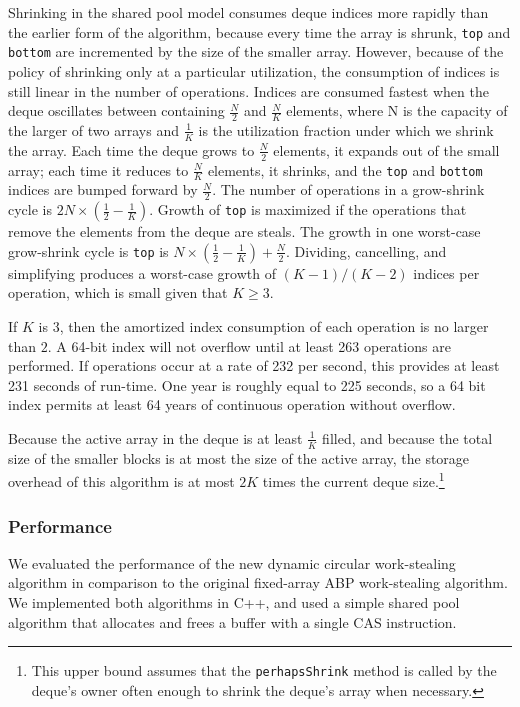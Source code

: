 Shrinking in the shared pool model consumes deque indices more rapidly
than the earlier form of the algorithm, because every time the array
is shrunk, \lstinline!top! and \lstinline!bottom! are incremented by
the size of the smaller array. However, because of the policy of
shrinking only at a particular utilization, the consumption of indices
is still linear in the number of operations. Indices are consumed
fastest when the deque oscillates between containing $\frac{N}{2}$ and
$\frac{N}{K}$ elements, where N is the capacity of the larger of two
arrays and $\frac{1}{K}$ is the utilization fraction under which we
shrink the array. Each time the deque grows to $\frac{N}{2}$ elements,
it expands out of the small array; each time it reduces to
$\frac{N}{K}$ elements, it shrinks, and the \lstinline!top! and
\lstinline!bottom! indices are bumped forward by $\frac{N}{2}$. The
number of operations in a grow-shrink cycle is $2N \times (\frac{1}{2}
- \frac{1}{K})$. Growth of \lstinline!top! is maximized if the
operations that remove the elements from the deque are steals. The
growth in one worst-case grow-shrink cycle is \lstinline!top! is $N
\times (\frac{1}{2} - \frac{1}{K}) + \frac{N}{2}$. Dividing,
cancelling, and simplifying produces a worst-case growth of $(K -
1)/(K - 2)$ indices per operation, which is small given that $K \ge
3$.

If $K$ is $3$, then the amortized index consumption of each operation
is no larger than $2$. A 64-bit index will not overflow until at least
263 operations are performed. If operations occur at a rate of 232 per
second, this provides at least 231 seconds of run-time. One year is
roughly equal to 225 seconds, so a 64 bit index permits at least 64
years of continuous operation without overflow.

Because the active array in the deque is at least $\frac{1}{K}$
filled, and because the total size of the smaller blocks is at most
the size of the active array, the storage overhead of this algorithm
is at most $2K$ times the current deque size.\footnote{This upper
  bound assumes that the \lstinline!perhapsShrink! method is called by
  the deque's owner often enough to shrink the deque's array when
  necessary.}

\subsubsection{Performance}

We evaluated the performance of the new dynamic circular work-stealing
algorithm in comparison to the original fixed-array ABP work-stealing
algorithm. We implemented both algorithms in C++, and used a simple
shared pool algorithm that allocates and frees a buffer with a single
CAS instruction.

